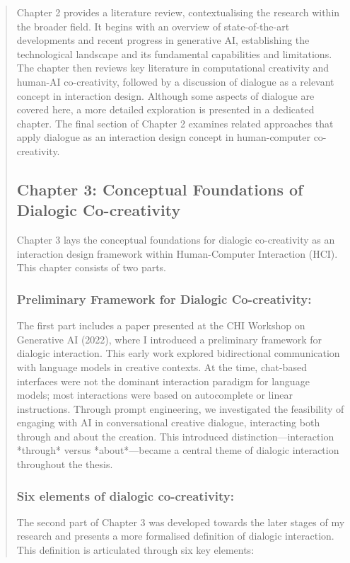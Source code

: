 \begin{quote}
Chapter 2 provides a literature review, contextualising the research within the broader field. It begins with an overview of state-of-the-art developments and recent progress in generative AI, establishing the technological landscape and its fundamental capabilities and limitations. The chapter then reviews key literature in computational creativity and human-AI co-creativity, followed by a discussion of dialogue as a relevant concept in interaction design. Although some aspects of dialogue are covered here, a more detailed exploration is presented in a dedicated chapter. The final section of Chapter 2 examines related approaches that apply dialogue as an interaction design concept in human-computer co-creativity.

\subsection*{Chapter 3: Conceptual Foundations of Dialogic Co-creativity}

Chapter 3 lays the conceptual foundations for dialogic co-creativity as an interaction design framework within Human-Computer Interaction (HCI). This chapter consists of two parts. 

\subsubsection{Preliminary Framework for Dialogic Co-creativity: } The first part includes a paper presented at the CHI Workshop on Generative AI (2022), where I introduced a preliminary framework for dialogic interaction. This early work explored bidirectional communication with language models in creative contexts. At the time, chat-based interfaces were not the dominant interaction paradigm for language models; most interactions were based on autocomplete or linear instructions. Through prompt engineering, we investigated the feasibility of engaging with AI in conversational creative dialogue, interacting both through and about the creation. This introduced distinction—interaction *through* versus *about*—became a central theme of dialogic interaction throughout the thesis.

\subsubsection{Six elements of dialogic co-creativity:} The second part of Chapter 3 was developed towards the later stages of my research and presents a more formalised definition of dialogic interaction. This definition is articulated through six key elements:


\end{quote}
